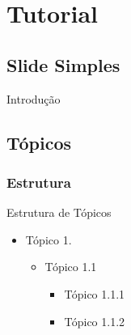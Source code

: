 \documentclass[aspectratio=169]{beamer}
\begin{document}
\newcommand{\autor}{Vinicius Takeo Friedrich Kuwaki}
\newcommand{\github}{github.com/takeofriedrich}
\newcommand{\email}{vtkwki@gmail.com}
\newcommand{\website}{}
\capa



\section{Tutorial}

\subsection{Slide Simples}

\begin{frame}{Introdução}
\lipsum[75]
\end{frame}


\subsection{Tópicos}
\subsubsection{Estrutura}

\begin{frame}{Estrutura de Tópicos}

    \begin{itemize}
        \item Tópico 1.
            \begin{itemize}
                \item Tópico 1.1
                    \begin{itemize}
                        \item Tópico 1.1.1
                        \item Tópico 1.1.2 
                    \end{itemize}
            \end{itemize}
    \end{itemize}
    
\end{frame}
\end{document}
